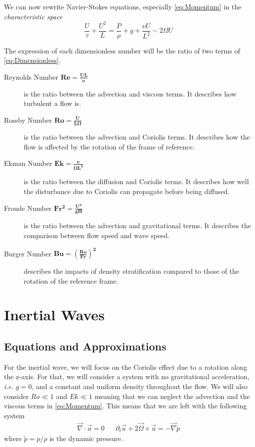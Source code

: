 We can now rewrite Navier-Stokes equations, especially \cref{eq:Momentum} in the \textit{characteristic space}
\begin{equation}
	\frac{U}{\tau} + \frac{U^2}{L} = \frac{P}{\rho} + g + \frac{\nu U}{L^2} - 2 \Omega U
	\label{eq:Dimensionless} 
\end{equation}

The expression of each dimensionless number will be the ratio of two terms of \cref{eq:Dimensionless}.

\begin{description}
	\item[Reynolds Number $\mathbf{Re = \frac{UL}{\nu}}$] is the ratio between the advection and viscous terms. It describes how turbulent a flow is.
	\item[Rossby Number $\mathbf{Ro = \frac{U}{L\Omega}}$] is the ratio between the advection and Coriolis terms. It describes how the flow is affected by the rotation of the frame of reference.
	\item[Ekman Number $\mathbf{Ek = \frac{\nu}{\Omega L^2}}$] is the ratio between the diffusion and Coriolis terms. It describes how well the disturbance due to Coriolis can propagate before being diffused.
	\item[Froude Number $\mathbf{Fr^2 = \frac{U^2}{gH}}$] is the ratio between the advection and gravitational terms. It describes the comparison between flow speed and wave speed.
	\item[Burger Number $\mathbf{Bu = \left(\frac{Ro}{Fr}\right)^2}$] describes the impacts of density stratification compared to those of the rotation of the reference frame.
\end{description}


\section{Inertial Waves}
\label{sec:Inertial}

\subsection{Equations and Approximations}
For the inertial wave, we will focus on the Coriolis effect due to a rotation along the z-axis. For that, we will consider a system with no gravitational acceleration, \textit{i.e.} $g=0$, and a constant and uniform density throughout the flow. We will also consider $Ro \ll 1$ and $Ek \ll 1$ meaning that we can neglect the advection and the viscous terms in \cref{eq:Momentum}. This means that we are left with the following system
\begin{align}
	\vec{\nabla} \cdot \vec{u} = 0 && \partial_t \vec{u} + 2 \vec{\Omega} \times \vec{u} = - \vec{\nabla} \tilde{p} 
	\label{eq:Inertial NS}
\end{align}
where $\tilde{p} = p/\rho$ is the dynamic pressure.


